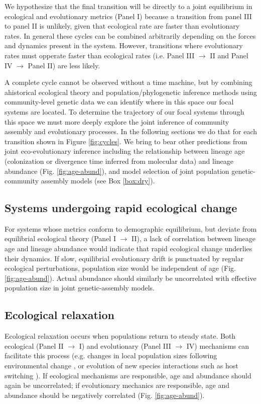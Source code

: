 \documentclass[12pt]{article}
\newcounter{Box}
\begin{document}
We hypothesize that the final transition will be directly to a joint
equilibrium in ecological and evolutionary metrics (Panel I) because a
transition from panel III to panel II is unlikely, given that
ecological rate are faster than evolutionary rates. In general these
cycles can be combined arbitrarily depending on the forces and
dynamics present in the system.  However, transitions where
evolutionary rates must opperate faster than ecological rates
(i.e. Panel III $\rightarrow$ II and Panel IV $\rightarrow$
Panel II) are less likely.

A complete cycle cannot be observed without a time machine, but by
combining ahistorical ecological theory and population/phylogenetic
inference methods using community-level genetic data we can identify
where in this space our focal systems are located. To determine the
trajectory of our focal systems through this space we must more deeply
explore the joint inference of community assembly and evolutionary
processes. In the following sections we do that for each transition
shown in Figure \ref{fig:cycles}. We bring to bear other predictions
from joint eco-evolutionary inference including the relationship
between lineage age (colonization or divergence time inferred from
molecular data) and lineage abundance (Fig. \ref{fig:age-abund}), and
model selection of joint population genetic-community assembly models
(see Box \ref{box:dry}).

\subsection{Systems undergoing rapid ecological change}

For systems whose metrics conform to demographic equilibrium, but
deviate from equilibrial ecological theory (Panel I $\rightarrow$ II),
a lack of correlation between lineage age and lineage abundance would
indicate that rapid ecological change underlies their dynamics. If
slow, equilibrial evolutionary drift is punctuated by regular
ecological perturbations, population size would be independent of age
(Fig. \ref{fig:age-abund}). Actual abundance should similarly be
uncorrelated with effective population size in joint genetic-assembly
models.

\subsection{Ecological relaxation}

Ecological relaxation occurs when populations return to steady
state. Both ecological (Panel II $\rightarrow$ I) and evolutionary
(Panel III $\rightarrow$ IV) mechanisms can facilitate this process
(e.g. changes in local population sizes following environmental change
\citep{blonder2015}, or evolution of new species interactions such as
host switching \citep{rominger2015}). If ecological mechanisms are
responsible, age and abundance should again be uncorrelated; if
evolutionary mechanics are responsible, age and abundance should be
negatively correlated (Fig. \ref{fig:age-abund}).
\end{document}

